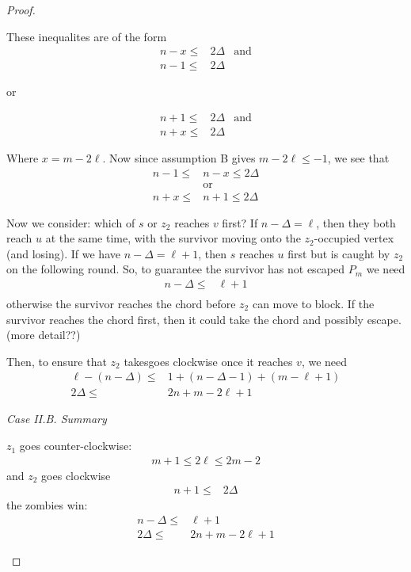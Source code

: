 \begin{proof}
\begin{description}
  These inequalites are of the form
  \begin{align*}
   n-x \leq & 2 \Delta & \text{and} \\
   n-1 \leq & 2\Delta
  \end{align*}
  \begin{center}or\end{center}
  \begin{align*}
   n + 1 \leq & 2 \Delta & \text{and} \\
   n + x \leq & 2 \Delta
  \end{align*}

  Where $x = m -2\ell$. Now since assumption B gives $m - 2\ell \leq -1$, we
  see that
  \begin{align*}
   n-1 \leq & n-x \leq 2 \Delta \\
            & \text{or}         \\
   n+x \leq & n+1 \leq 2 \Delta
  \end{align*}

  Now we consider: which of $s$ or $z_2$ reaches $v$ first?
  If $n - \Delta = \ell$, then they both reach $u$ at the same time,
  with the survivor moving onto the $z_2$-occupied vertex (and losing).
  If we have $n - \Delta = \ell + 1$, then $s$ reaches $u$ first
  but is caught by $z_2$ on the following round.
  So, to guarantee the survivor has not escaped $P_m$ we need
  \begin{align*}
   n - \Delta \leq & \ell + 1 \\
  \end{align*}
  otherwise the survivor reaches the chord before $z_2$ can move
  to block. If the survivor reaches the chord first, then it could
  take the chord and possibly escape. (more detail??)

  Then, to ensure that $z_2$ takesgoes clockwise once
  it reaches $v$, we need
  \begin{align*}
   \ell - (n - \Delta) \leq & 1 + (n - \Delta - 1) + (m - \ell + 1) \\
   2 \Delta \leq            & 2n + m - 2\ell + 1
  \end{align*}

  \textit{Case II.B. Summary}

  $z_1$ goes counter-clockwise:
  \begin{align*}
   m + 1 \leq 2 \ell \leq 2m - 2
  \end{align*}
  and $z_2$ goes clockwise
  \begin{align*}
   n+1 \leq & 2 \Delta
  \end{align*}
  the zombies win:
  \begin{align*}
   n - \Delta \leq & \ell + 1           \\
   2 \Delta \leq   & 2n + m - 2\ell + 1
  \end{align*}



\end{description}
\end{proof}

